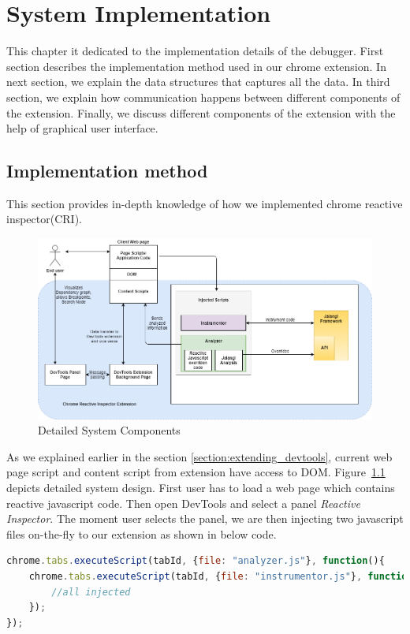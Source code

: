 \chapter{System Implementation} \label{chap:Implementation}
This chapter it dedicated to the implementation details of the debugger. First section describes the implementation method used in our chrome extension. In next section, we explain the data structures that captures all the data. In third section, we explain how communication happens between different components of the extension. Finally, we discuss different components of the extension with the help of graphical user interface.

\section{Implementation method}
This section provides in-depth knowledge of how we implemented chrome reactive inspector(CRI).

 
\begin{figure}[!h]
	\centering
	\includegraphics[scale=0.5,trim=0 0 0 0]{images/detailed-system-implementation.png}
	\caption{Detailed System Components}
	\label{fig:detailed-system-implementation}
\end{figure}
As we explained earlier in the section \ref{section:extending_devtools}, current web page script and content script from extension have access to DOM. Figure~\ref{fig:detailed-system-implementation} depicts detailed system design. First user has to load a web page which contains reactive javascript code. Then open DevTools and select a panel \textit{Reactive Inspector}. The moment user selects the panel, we are then injecting two javascript files on-the-fly to our extension as shown in below code.


\begin{lstlisting}[language=JavaScript, caption=Injecting Javascript Files, label={lst:inject-javascript-files}]
chrome.tabs.executeScript(tabId, {file: "analyzer.js"}, function(){
	chrome.tabs.executeScript(tabId, {file: "instrumentor.js"}, function(){
		//all injected
	});
});
\end{lstlisting}

